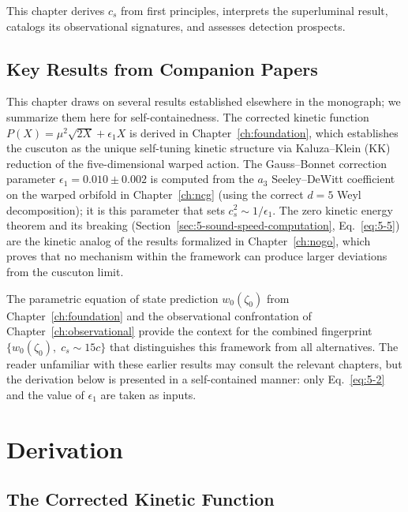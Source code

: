 This chapter derives $c_s$ from first principles, interprets the superluminal result, catalogs its observational signatures, and assesses detection prospects.

\subsection*{Key Results from Companion Papers}

This chapter draws on several results established elsewhere in the monograph; we summarize them here for self-containedness. The corrected kinetic function $P(X) = \mu^2\sqrt{2X} + \epsilon_1 X$ is derived in Chapter~\ref{ch:foundation}, which establishes the cuscuton as the unique self-tuning kinetic structure via Kaluza--Klein (KK) reduction of the five-dimensional warped action. The Gauss--Bonnet correction parameter $\epsilon_1 = 0.010 \pm 0.002$ is computed from the $a_3$ Seeley--DeWitt coefficient on the warped orbifold in Chapter~\ref{ch:ncg} (using the correct $d = 5$ Weyl decomposition); it is this parameter that sets $c_s^2 \sim 1/\epsilon_1$. The zero kinetic energy theorem and its breaking (Section~\ref{sec:5-sound-speed-computation}, Eq.~\ref{eq:5-5}) are the kinetic analog of the results formalized in Chapter~\ref{ch:nogo}, which proves that no mechanism within the framework can produce larger deviations from the cuscuton limit.

The parametric equation of state prediction $w_0(\zeta_0)$ from Chapter~\ref{ch:foundation} and the observational confrontation of Chapter~\ref{ch:observational} provide the context for the combined fingerprint $\{w_0(\zeta_0),\; c_s \sim 15c\}$ that distinguishes this framework from all alternatives. The reader unfamiliar with these earlier results may consult the relevant chapters, but the derivation below is presented in a self-contained manner: only Eq.~\ref{eq:5-2} and the value of $\epsilon_1$ are taken as inputs.

\section{Derivation}
\label{sec:5-derivation}

\subsection{The Corrected Kinetic Function}
\label{sec:5-corrected-kinetic}

